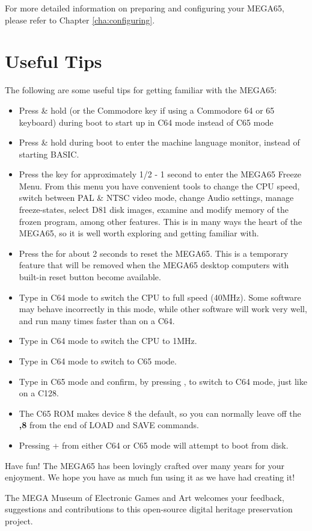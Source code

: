 For more detailed information on preparing and configuring your MEGA65, please refer to Chapter \ref{cha:configuring}.

\section{Useful Tips}

The following are some useful tips for getting familiar with the MEGA65:

\begin{itemize}

\item{Press \& hold \megasymbolkey (or the Commodore key if using a Commodore 64 or 65 keyboard) during boot to start up in C64 mode instead of C65 mode}
 \item{Press \& hold  during boot to enter the machine language monitor, instead of starting BASIC.}
\item{Press the  key for approximately 1/2 - 1 second to enter the MEGA65 Freeze Menu.  From this menu
  you have convenient tools to change the CPU speed, switch between PAL \& NTSC video mode, change Audio settings, manage freeze-states,
   select D81 disk images, examine and modify memory of the frozen program, among other features.  This is in many ways the heart of the MEGA65, so it is well worth exploring and getting familiar with.}
\item{Press the  for about 2 seconds to reset the MEGA65.  This is a temporary feature that will be removed when the MEGA65 desktop computers with built-in reset button become available.}
\item{Type  in C64 mode to switch  the CPU to full speed (40MHz). Some software may behave incorrectly in this mode, while other software will work very well, and run many times faster than on a C64.}
\item{Type  in C64 mode to switch the CPU to 1MHz.}
\item{Type  in C64 mode to switch to C65 mode.}
\item{Type  in C65 mode and confirm, by pressing , to switch to C64 mode, just like on a C128.}
\item{The C65 ROM makes device 8 the default, so you can normally leave off the \textbf{,8} from the end of LOAD and SAVE commands.}
\item{Pressing  +  from either C64 or C65 mode will attempt to boot from disk.}
\end{itemize}

Have fun! The MEGA65 has been lovingly crafted over many years for your enjoyment. We hope you have as much fun using it as we have had creating it!

The MEGA Museum of Electronic Games and Art welcomes your feedback, suggestions and contributions to this open-source digital heritage preservation project.
